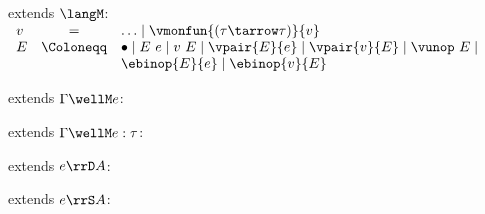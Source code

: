 \begin{flushleft}

 extends $\langM$:\\
$\begin{array}{l c l}
  v & = & \ldots \mid \vmonfun{(\tau\tarrow\tau)}{v}
\\
  E & \Coloneqq & \bullet \mid E~e \mid v~E \mid
                  \vpair{E}{e} \mid \vpair{v}{E} \mid \vunop~E \mid
\\ & &            \ebinop{E}{e} \mid \ebinop{v}{E}
\end{array}$

\medskip
\begin{minipage}[t]{0.5\textwidth}
 extends $\Gamma \wellM e$:
\begin{mathpar}
\end{mathpar}
\end{minipage}%
\begin{minipage}[t]{0.5\textwidth}
 extends $\Gamma \wellM e : \tau$:
\begin{mathpar}
\end{mathpar}
\end{minipage}

\medskip
\begin{minipage}[t]{0.5\textwidth}
 extends $e \rrD A$:
\begin{mathpar}
\end{mathpar}
\end{minipage}%
\begin{minipage}[t]{0.5\textwidth}
 extends $e \rrS A$:
\begin{mathpar}
\end{mathpar}
\end{minipage}%

\medskip
{}
\begin{mathpar}


\end{mathpar}
\end{flushleft}
